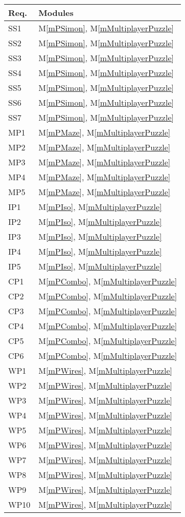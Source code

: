 \documentclass[12pt, titlepage]{article}
\newcommand{\mref}[1]{M\ref{#1}}
\begin{document}
\begin{table}[H]
\centering
\begin{tabular}{p{} p{}}
\toprule
\textbf{Req.} & \textbf{Modules}\\
\midrule
SS1 & \mref{mPSimon}, \mref{mMultiplayerPuzzle}\\
SS2 & \mref{mPSimon}, \mref{mMultiplayerPuzzle}\\
SS3 & \mref{mPSimon}, \mref{mMultiplayerPuzzle}\\
SS4 & \mref{mPSimon}, \mref{mMultiplayerPuzzle}\\
SS5 & \mref{mPSimon}, \mref{mMultiplayerPuzzle}\\
SS6 & \mref{mPSimon}, \mref{mMultiplayerPuzzle}\\
SS7 & \mref{mPSimon}, \mref{mMultiplayerPuzzle}\\
MP1 & \mref{mPMaze}, \mref{mMultiplayerPuzzle}\\
MP2 & \mref{mPMaze}, \mref{mMultiplayerPuzzle}\\
MP3 & \mref{mPMaze}, \mref{mMultiplayerPuzzle}\\
MP4 & \mref{mPMaze}, \mref{mMultiplayerPuzzle}\\
MP5 & \mref{mPMaze}, \mref{mMultiplayerPuzzle}\\
IP1 & \mref{mPIso}, \mref{mMultiplayerPuzzle}\\
IP2 & \mref{mPIso}, \mref{mMultiplayerPuzzle}\\
IP3 & \mref{mPIso}, \mref{mMultiplayerPuzzle}\\
IP4 & \mref{mPIso}, \mref{mMultiplayerPuzzle}\\
IP5 & \mref{mPIso}, \mref{mMultiplayerPuzzle}\\
CP1 & \mref{mPCombo}, \mref{mMultiplayerPuzzle}\\
CP2 & \mref{mPCombo}, \mref{mMultiplayerPuzzle}\\
CP3 & \mref{mPCombo}, \mref{mMultiplayerPuzzle}\\
CP4 & \mref{mPCombo}, \mref{mMultiplayerPuzzle}\\
CP5 & \mref{mPCombo}, \mref{mMultiplayerPuzzle}\\
CP6 & \mref{mPCombo}, \mref{mMultiplayerPuzzle}\\
WP1 & \mref{mPWires}, \mref{mMultiplayerPuzzle}\\
WP2 & \mref{mPWires}, \mref{mMultiplayerPuzzle}\\
WP3 & \mref{mPWires}, \mref{mMultiplayerPuzzle}\\
WP4 & \mref{mPWires}, \mref{mMultiplayerPuzzle}\\
WP5 & \mref{mPWires}, \mref{mMultiplayerPuzzle}\\
WP6 & \mref{mPWires}, \mref{mMultiplayerPuzzle}\\
WP7 & \mref{mPWires}, \mref{mMultiplayerPuzzle}\\
WP8 & \mref{mPWires}, \mref{mMultiplayerPuzzle}\\
WP9 & \mref{mPWires}, \mref{mMultiplayerPuzzle}\\
WP10 & \mref{mPWires}, \mref{mMultiplayerPuzzle}\\




\end{tabular}
\end{table}
\end{document}
